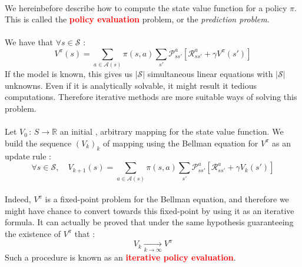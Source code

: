 \documentclass[a4paper]{article}
\begin{document}
{{			\paragraph{} We hereinbefore describe how to compute the state value function for a policy $\pi$. This is called the \textbf{\textcolor{red}{policy evaluation}} problem, or the \emph{prediction problem}. 
			
			\paragraph{} We have that $\forall s \in\mathcal{S}$ : 
			\begin{equation}
				V^\pi(s) = \sum_{a\in\mathcal{A}(s)} \pi(s,a) \sum_{s'} \mathcal{P}_{ss'}^a \left[ \mathcal{R}_{ss'}^a + \gamma V^\pi(s')\right] 
			\end{equation}
			If the model is known, this gives us $\vert \mathcal{S}\vert $ simultaneous linear equations with $\vert \mathcal{S} \vert $ unknowns. Even if it is analytically solvable, it might result it tedious computations. Therefore iterative methods are more suitable ways of solving this problem. 
			
			\paragraph{} Let $V_0\, : \, S \to \mathbb{R}$ an initial , arbitrary mapping for the state value function. We build the sequence $(V_k)_k$ of mapping using the Bellman equation for $V^\pi$ as an update rule : 
			\begin{equation}
				\forall{s}\in\mathcal{S}, \quad V_{k+1} (s) =  \sum_{a\in\mathcal{A}(s)} \pi(s,a) \sum_{s'} \mathcal{P}_{ss'}^a \left[ \mathcal{R}_{ss'}^a + \gamma V_k(s')\right] 
			\end{equation}
			
			\paragraph{} Indeed, $V^\pi$ is a fixed-point problem for the Bellman equation, and therefore we might have chance to convert towards this fixed-point by using it as an iterative formula. It can actually be proved that under the same hypothesis guaranteeing the existence of $V^\pi$ that : 
			\begin{equation} 
				V_k \underset{k\to\infty}{\longrightarrow} V^\pi
			\end{equation} 
			Such a procedure is known as an \textbf{\textcolor{red}{iterative policy evaluation}}. 
			\vspace{10pt}
			
}}
\end{document}
